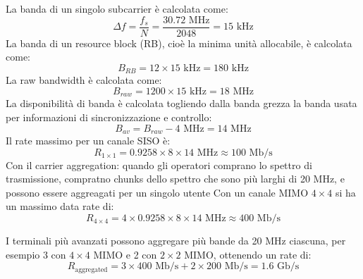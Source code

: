 


La banda di un singolo subcarrier è calcolata come:
\[
    \Delta f = \frac{f_s}{N} = \frac{30.72 \text{ MHz}}{2048} = 15 \text{ kHz}
\]
La banda di un resource block (RB), cioè la minima unità allocabile, è calcolata come:
\[
    B_{RB} = 12 \times 15 \text{ kHz} = 180 \text{ kHz}
\]
La raw bandwidth è calcolata come:
\[
B_{raw} = 1200 \times 15 \text{ kHz} = 18 \text{ MHz}
\]
La disponibilità di banda è calcolata togliendo dalla banda grezza la banda usata per informazioni di sincronizzazione e controllo:
\[
B_{av} = B_{raw} - 4 \text{ MHz} = 14 \text{ MHz}
\]
Il rate massimo per un canale SISO è:
\[
    R_{1 \times 1} = 0.9258 \times 8 \times 14 \text{ MHz} \approx 100 \text{ Mb/s}
\]
Con il carrier aggregation: quando gli operatori comprano lo spettro di trasmissione, compratno chunks dello spettro che sono più larghi di 20 MHz, e possono essere aggreagati per un singolo utente
Con un canale MIMO $4 \times 4$ si ha un massimo data rate di:
\[
    R_{4 \times 4} = 4 \times 0.9258 \times 8 \times 14 \text{ MHz} \approx 400 \text{ Mb/s}
\]


I terminali più avanzati possono aggregare più bande da 20 MHz ciascuna, per esempio 3 con $4 \times 4$ MIMO e 2 con $2 \times 2$ MIMO, ottenendo un rate di:
\[
    R_{\text{aggregated}} = 3 \times 400 \text{ Mb/s} + 2 \times 200 \text{ Mb/s} = 1.6 \text{ Gb/s}
\]

